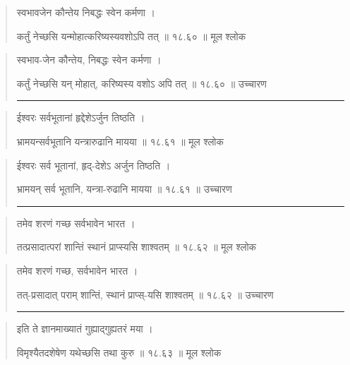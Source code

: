 \begin{quotation}

स्वभावजेन कौन्तेय निबद्धः स्वेन कर्मणा  ।  

कर्तुं नेच्छसि यन्मोहात्करिष्यस्यवशोऽपि तत्‌  ॥ १८.६० ॥  मूल श्लोक
\end{quotation}

\begin{quotation}

स्वभाव-जेन कौन्तेय, निबद्धः स्वेन कर्मणा  ।  

कर्तुं नेच्छसि यन् मोहात्, करिष्यस्य वशोऽ अपि तत्‌  ॥ १८.६० ॥  उच्चारण

\noindent\rule{16cm}{0.4pt} 
\end{quotation}


\begin{quotation}

ईश्वरः सर्वभूतानां हृद्देशेऽर्जुन तिष्ठति ।  

भ्रामयन्सर्वभूतानि यन्त्रारुढानि मायया  ॥ १८.६१ ॥  मूल श्लोक
\end{quotation}

\begin{quotation}

ईश्वरः सर्व भूतानां, हृद्-देशेऽ अर्जुन तिष्ठति ।  

भ्रामयन् सर्व भूतानि, यन्त्रा-रुढानि मायया  ॥ १८.६१ ॥  उच्चारण

\noindent\rule{16cm}{0.4pt} 
\end{quotation}


\begin{quotation}

तमेव शरणं गच्छ सर्वभावेन भारत ।  

तत्प्रसादात्परां शान्तिं स्थानं प्राप्स्यसि शाश्वतम्‌  ॥ १८.६२ ॥  मूल श्लोक
\end{quotation}

\begin{quotation}

तमेव शरणं गच्छ, सर्वभावेन भारत ।  

तत्-प्रसादात् पराम् शान्तिं, स्थानं प्राप्स्-यसि शाश्वतम्‌  ॥ १८.६२ ॥  उच्चारण

\noindent\rule{16cm}{0.4pt} 
\end{quotation}


\begin{quotation}

इति ते ज्ञानमाख्यातं गुह्याद्‍गुह्यतरं मया  ।  

विमृश्यैतदशेषेण यथेच्छसि तथा कुरु  ॥ १८.६३ ॥  मूल श्लोक
\end{quotation}

